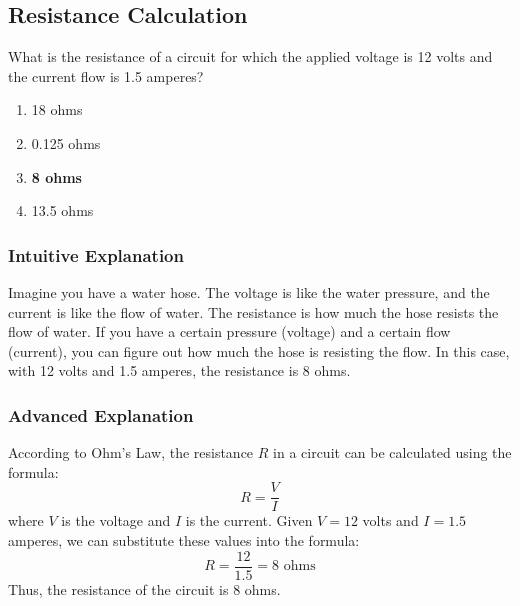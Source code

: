 \subsection{Resistance Calculation}
\label{T5D05}

\begin{tcolorbox}[colback=gray!10!white,colframe=black!75!black,title=T5D05]
What is the resistance of a circuit for which the applied voltage is 12 volts and the current flow is 1.5 amperes?
\begin{enumerate}[noitemsep]
    \item 18 ohms
    \item 0.125 ohms
    \item \textbf{8 ohms}
    \item 13.5 ohms
\end{enumerate}
\end{tcolorbox}

\subsubsection*{Intuitive Explanation}
Imagine you have a water hose. The voltage is like the water pressure, and the current is like the flow of water. The resistance is how much the hose resists the flow of water. If you have a certain pressure (voltage) and a certain flow (current), you can figure out how much the hose is resisting the flow. In this case, with 12 volts and 1.5 amperes, the resistance is 8 ohms.

\subsubsection*{Advanced Explanation}
According to Ohm's Law, the resistance \( R \) in a circuit can be calculated using the formula:
\[
R = \frac{V}{I}
\]
where \( V \) is the voltage and \( I \) is the current. Given \( V = 12 \) volts and \( I = 1.5 \) amperes, we can substitute these values into the formula:
\[
R = \frac{12}{1.5} = 8 \text{ ohms}
\]
Thus, the resistance of the circuit is 8 ohms.